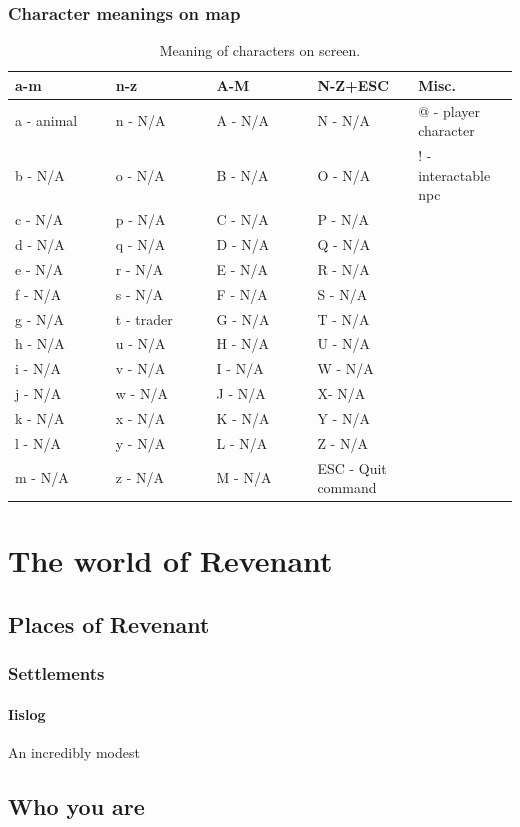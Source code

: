 \documentclass{report}
\begin{document}
\subsection{Character meanings on map}
\begin{table}[h!]

\begin{tabular}{|p{0.2\linewidth}|p{0.2\linewidth}| p{0.2\linewidth}|p{0.2\linewidth}|p{0.2\linewidth}|} 
\hline
 a-m & n-z & A-M & N-Z+ESC & Misc. \\ [0.5ex] 
 \hline
 a - animal & n - N/A & A - N/A & N - N/A & @ - player character\\ 
 b - N/A & o - N/A & B - N/A & O - N/A  & ! - interactable npc \\ 
 c - N/A & p - N/A & C - N/A & P - N/A \\
 d - N/A & q - N/A & D - N/A & Q - N/A  \\
 e - N/A & r - N/A & E - N/A & R - N/A \\
 f - N/A & s - N/A & F - N/A & S - N/A \\
 g - N/A & t - trader & G - N/A & T - N/A \\
 h - N/A & u - N/A & H - N/A & U - N/A \\
 i - N/A & v - N/A & I - N/A & W - N/A \\
 j - N/A & w - N/A & J - N/A & X- N/A \\
 k - N/A & x - N/A & K - N/A & Y - N/A \\
 l - N/A & y - N/A & L - N/A & Z - N/A \\
 m - N/A & z - N/A & M - N/A & ESC - Quit command \\ [1ex] 
 \hline
\end{tabular}
\caption{Meaning of characters on screen.}
\label{table:1}
\end{table}

\chapter*{The world of Revenant}

\section*{Places of Revenant}
\subsection*{Settlements}
\subsubsection*{Iislog}
An incredibly modest 
\section*{Who you are}
\end{document}
